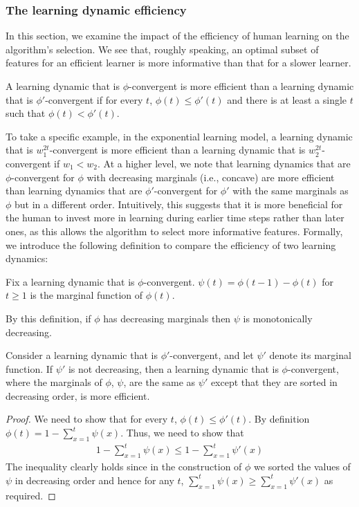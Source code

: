 \subsubsection{The learning dynamic efficiency} \label{sec-eff-learning}
In this section, we examine the impact of the efficiency of human learning on the algorithm's selection.
We see that, roughly speaking, an optimal subset of features for an efficient learner 
is more informative than that for a
slower learner. 

\begin{definition}
A learning dynamic that is $\phi$-convergent is more efficient than a learning dynamic that is $\phi'$-convergent if for every $t$, $\phi(t) \leq \phi'(t)$ and there is at least a single $t$ such that $\phi(t) < \phi'(t)$.
\end{definition}

To take a specific example, in the exponential learning model, a learning dynamic that is 
$w_1^{2t}$-convergent is more efficient than a learning dynamic that is $w_2^{2t}$-convergent if $w_1 < w_2$. At a higher level, we note that learning dynamics that are $\phi$-convergent for $\phi$ with decreasing marginals (i.e., concave) are more efficient than learning dynamics that are $\phi'$-convergent for $\phi'$ with the same marginals as $\phi$ but in a different order. 
Intuitively, this suggests that it is more beneficial for the human to invest more in learning during earlier time steps rather than later ones, as this allows the algorithm to select more informative features.
Formally, we introduce the following definition to compare the efficiency %
of two learning dynamics:
\begin{definition}
Fix a learning dynamic that is $\phi$-convergent. $\psi(t) = \phi(t-1) - \phi(t)$ for $t\geq 1$ is the marginal function of $\phi(t)$. 
\end{definition}
By this definition, if $\phi$ has decreasing marginals then $\psi$ is monotonically decreasing. 
\begin{claim}
Consider a learning dynamic that is $\phi'$-convergent, and let $\psi'$ denote its marginal function. If $\psi'$ is not decreasing, then a learning dynamic that is $\phi$-convergent, where the marginals of $\phi$, $\psi$, are the same as $\psi'$ except that they are sorted in decreasing order, is more efficient.
\end{claim}
\begin{proof}
We need to show that for every $t$, $\phi(t) \leq \phi'(t)$. By definition $\phi(t) = 1-\sum_{x=1}^t \psi(x)$. Thus, we need to show that 
\begin{align*}
 1-\sum_{x=1}^t \psi(x) \leq  1-\sum_{x=1}^t \psi'(x)
\end{align*}
The inequality clearly holds since in the construction of $\phi$ we sorted the values of $\psi$ in decreasing order and hence for any $t$, $\sum_{x=1}^t \psi(x) \geq\sum_{x=1}^t \psi'(x)$ as required.
\end{proof}




